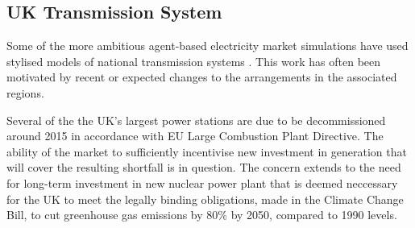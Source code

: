 %
%

\subsection{UK Transmission System}
Some of the more ambitious agent-based electricity market simulations have used
stylised models of national transmission systems
\cite{cincotti:09,weidlich:06}.  This work has often been motivated by recent
or expected changes to the arrangements in the associated regions.


Several of the the UK's largest power stations are due to be decommissioned
around 2015 in accordance with EU Large Combustion Plant Directive.  The
ability of the market to sufficiently incentivise new investment in generation
that will cover the resulting shortfall is in question.  The concern extends
to the need for long-term investment in new nuclear power plant that is deemed
neccessary for the UK to meet the legally binding obligations, made in the
Climate Change Bill, to cut greenhouse gas emissions by 80\% by 2050, compared
to 1990 levels.


